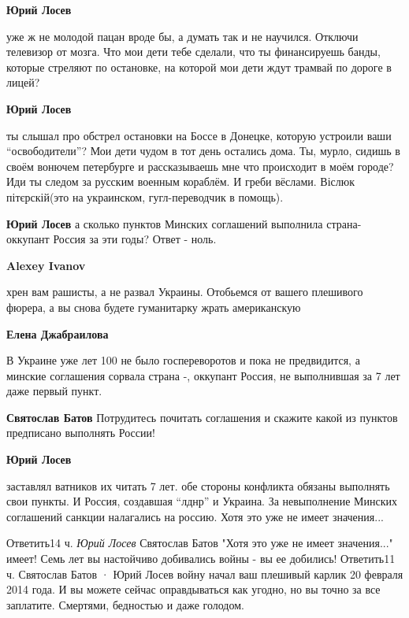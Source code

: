 \begin{itemize}
\begin{itemize}
\textbf{Юрий Лосев} 

уже ж не молодой пацан вроде бы, а думать так и не научился. Отключи телевизор
от мозга. Что мои дети тебе сделали, что ты финансируешь банды, которые
стреляют по остановке, на которой мои дети ждут трамвай по дороге в лицей?

\textbf{Юрий Лосев} 

ты слышал про обстрел остановки на Боссе в Донецке, которую устроили ваши
\enquote{освободители}? Мои дети чудом в тот день остались дома. Ты, мурло, сидишь в
своём вонючем петербурге и рассказываешь мне что происходит в моём городе? Иди
ты следом за русским военным кораблём. И греби вёслами. Віслюк пітєрскій(это на
украинском, гугл-переводчик в помощь).

\textbf{Юрий Лосев} а сколько пунктов Минских соглашений выполнила страна-оккупант Россия за эти годы? Ответ - ноль.

\textbf{Alexey Ivanov} 

хрен вам рашисты, а не развал Украины. Отобьемся от вашего плешивого фюрера, а
вы снова будете гуманитарку жрать американскую

\textbf{Елена Джабраилова} 

В Украине уже лет 100 не было госпереворотов и пока не предвидится, а минские
соглашения сорвала страна -, оккупант Россия, не выполнившая за 7 лет даже первый
пункт.

\textbf{Святослав Батов} Потрудитесь почитать соглашения и скажите какой из пунктов предписано выполнять России!

\textbf{Юрий Лосев} 

заставлял ватников их читать 7 лет. обе стороны конфликта обязаны выполнять
свои пункты. И Россия, создавшая \enquote{лднр} и Украина. За невыполнение Минских
соглашений санкции налагались на россию. Хотя это уже не имеет значения...

Ответить14 ч.
\emph{Юрий Лосев}
Святослав Батов "Хотя это уже не имеет значения..." имеет! Семь лет вы настойчиво добивались войны - вы ее добились!
Ответить11 ч.
Святослав Батов
  · 
Юрий Лосев войну начал ваш плешивый карлик 20 февраля 2014 года. И вы можете сейчас оправдываться как угодно, но вы точно за все заплатите. Смертями, бедностью и даже голодом.

\end{itemize} %

\end{itemize} %
